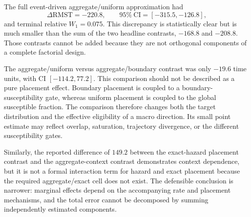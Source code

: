 The full event-driven aggregate/uniform approximation had
\[
\Delta\mathrm{RMST}=-220.8,
\qquad
95\%\ \mathrm{CI}=[-315.5,-126.8],
\]
and terminal relative $W_1=0.075$.  This discrepancy is statistically clear but is much smaller than the sum of the two headline contrasts, $-168.8$ and $-208.8$.  Those contrasts cannot be added because they are not orthogonal components of a complete factorial design.

The aggregate/uniform versus aggregate/boundary contrast was only $-19.6$ time units, with CI $[-114.2,77.2]$.  This comparison should not be described as a pure placement effect.  Boundary placement is coupled to a boundary-susceptibility gate, whereas uniform placement is coupled to the global susceptible fraction.  The comparison therefore changes both the target distribution and the effective eligibility of a macro direction.  Its small point estimate may reflect overlap, saturation, trajectory divergence, or the different susceptibility gates.

Similarly, the reported difference of $149.2$ between the exact-hazard placement contrast and the aggregate-context contrast demonstrates context dependence, but it is not a formal interaction term for hazard and exact placement because the required aggregate/exact cell does not exist.  The defensible conclusion is narrower: marginal effects depend on the accompanying rate and placement mechanisms, and the total error cannot be decomposed by summing independently estimated components.

